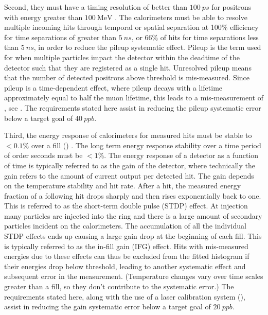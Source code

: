 Second, they must have a timing resolution of better than $\SI{100}{ps}$ for positrons with energy greater than $\SI{100}{\MeV}$ \cite{TDR}. The calorimeters must be able to resolve multiple incoming hits through temporal or spatial separation at 100\% efficiency for time separations of greater than $\SI{5}{ns}$, or 66\% of hits for time separations less than $\SI{5}{ns}$, in order to reduce the pileup systematic effect. Pileup is the term used for when multiple particles impact the detector within the deadtime of the detector such that they are registered as a single hit. Unresolved pileup means that the number of detected positrons above threshold is mis-measured. Since pileup is a time-dependent effect, where pileup decays with a lifetime approximately equal to half the muon lifetime, this leads to a mis-measurement of \wa, see . The requirements stated here assist in reducing the pileup systematic error below a target goal of $\SI{40}{ppb}$.

Third, the energy response of calorimeters for measured hits must be stable to $< 0.1\%$ over a fill () \cite{TDR}. The long term energy response stability over a time period of order seconds must be $< 1\%$. The energy response of a detector as a function of time is typically referred to as the gain of the detector, where technically the gain refers to the amount of current output per detected hit. The gain depends on the temperature stability and hit rate. After a hit, the measured energy fraction of a following hit drops sharply and then rises exponentially back to one. This is referred to as the short-term double pulse (STDP) effect. At injection many particles are injected into the ring and there is a large amount of secondary particles incident on the calorimeters. The accumulation of all the individual STDP effects ends up causing a large gain drop at the beginning of each fill. This is typically referred to as the in-fill gain (IFG) effect. Hits with mis-measured energies due to these effects can thus be excluded from the fitted histogram if their energies drop below threshold, leading to another systematic effect and subsequent error in the \wa measurement. (Temperature changes vary over time scales greater than a fill, so they don't contribute to the systematic error.) The requirements stated here, along with the use of a laser calibration system (), assist in reducing the gain systematic error below a target goal of $\SI{20}{ppb}$.



